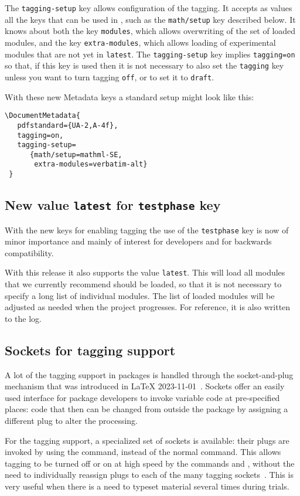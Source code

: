 \documentclass{ltnews}
\begin{document}
The \texttt{tagging-setup} key allows configuration of the tagging. It
accepts as values all the keys that can be used in ,
such as the \texttt{math/setup} key described below. It knows about
both the key \texttt{modules}, which allows overwriting of the set of
loaded modules, and the key \texttt{extra-modules}, which allows
loading of experimental modules that are not yet in \texttt{latest}.
%
The \texttt{tagging-setup} key implies \texttt{tagging=on} so that, if
this key is used then it is not necessary to also set the
\texttt{tagging} key unless you want to turn tagging \texttt{off}, or
to set it to \texttt{draft}.

With these new Metadata keys a standard setup might look like this:
\begin{verbatim}
\DocumentMetadata{
   pdfstandard={UA-2,A-4f},
   tagging=on,
   tagging-setup=
      {math/setup=mathml-SE,
       extra-modules=verbatim-alt}
 }      
\end{verbatim}


\subsection{New value \texttt{latest} for \texttt{testphase} key}

With the new keys for enabling tagging the use of the
\texttt{testphase} key is now of minor importance and mainly of
interest for developers and for backwards compatibility.

With this release it also supports the value \texttt{latest}.  This
will load all modules that we currently recommend should be loaded, so
that it is not necessary to specify a long list of individual
modules. The list of loaded modules will be adjusted as needed when
the project progresses. For reference, it is also written to the log.


\subsection{Sockets for tagging support}

A lot of the tagging support in packages is handled through the
socket-and-plug mechanism that was introduced in \LaTeX{}
2023-11-01~\cite[p.\,93]{41:ltnews}.
%
Sockets offer an easily used interface for package developers to
invoke variable code at pre-specified places: code that then can be
changed from outside the package by assigning a different plug to
alter the processing.

For the tagging support, a specialized set of sockets is available:
their plugs are invoked by using the  command,
instead of the normal  command. This allows tagging to
be turned off or on at high speed by the commands 
and , without the need to individually reassign
plugs to each of the many tagging
sockets~\cite[p.\,97]{41:ltnews}. This is very useful when there is a
need to typeset material several times during trials.
\end{document}
